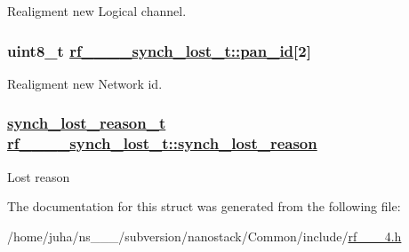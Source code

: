 Realigment new Logical channel. \hypertarget{structrf__802__15__4__synch__lost__t_ed60608d32963aac8f9609578be68f8b}{
\subsubsection[pan\_\-id]{\setlength{\rightskip}{0pt plus 5cm}uint8\_\-t \hyperlink{structrf__802__15__4__synch__lost__t_ed60608d32963aac8f9609578be68f8b}{rf\_\_\_\_\-synch\_\-lost\_\-t::pan\_\-id}\mbox{[}2\mbox{]}}}
\label{structrf__802__15__4__synch__lost__t_ed60608d32963aac8f9609578be68f8b}


Realigment new Network id. \hypertarget{structrf__802__15__4__synch__lost__t_5ee82a6d8ff2eb566f6aa375d38ea1ff}{
\subsubsection[synch\_\-lost\_\-reason]{\setlength{\rightskip}{0pt plus 5cm}\hyperlink{rf__802__15__4_8h_b7a607c44af208866c5d708fd7729b62}{synch\_\-lost\_\-reason\_\-t} \hyperlink{structrf__802__15__4__synch__lost__t_5ee82a6d8ff2eb566f6aa375d38ea1ff}{rf\_\_\_\_\-synch\_\-lost\_\-t::synch\_\-lost\_\-reason}}}
\label{structrf__802__15__4__synch__lost__t_5ee82a6d8ff2eb566f6aa375d38ea1ff}


Lost reason 

The documentation for this struct was generated from the following file:\begin{CompactItemize}
\item 
/home/juha/ns\_\_\_/subversion/nanostack/Common/include/\hyperlink{rf__802__15__4_8h}{rf\_\_\_\-4.h}\end{CompactItemize}
